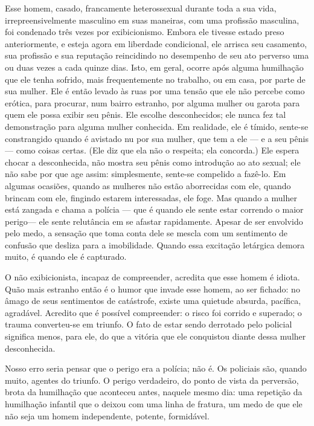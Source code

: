 Esse homem, casado, francamente heterossexual durante toda a sua
vida, irrepreensivelmente masculino em suas maneiras, com uma profissão
masculina, foi condenado três vezes por exibicionismo. Embora ele
tivesse estado preso anteriormente, e esteja agora em liberdade
condicional, ele arrisca seu casamento, sua profissão e sua reputação
reincidindo no desempenho de seu ato perverso uma ou duas vezes a cada
quinze dias. Isto, em geral, ocorre após alguma humilhação que ele
tenha sofrido, mais frequentemente no trabalho, ou em casa, por parte
de sua mulher. Ele é então levado às ruas por uma tensão que ele não
percebe como erótica, para procurar, num bairro estranho, por alguma
mulher ou garota para quem ele possa exibir seu pênis. Ele escolhe
desconhecidos; ele nunca fez tal demonstração para alguma mulher
conhecida. Em realidade, ele é tímido, sente-se constrangido quando é
avistado nu por sua mulher, que tem a ele --- e a seu pênis --- como
coisas certas. (Ele diz que ela não o respeita; ela concorda.) Ele
espera chocar a desconhecida, não mostra seu pênis como introdução ao
ato sexual; ele não sabe por que age assim: simplesmente, sente-se
compelido a fazê-lo. Em algumas ocasiões, quando as mulheres não estão
aborrecidas com ele, quando brincam com ele, fingindo estarem
interessadas, ele foge. Mas quando a mulher está zangada e chama a
polícia --- que é quando ele sente estar correndo o maior perigo\idxexibiexpo[|(] ---
ele sente relutância em se afastar rapidamente. Apesar de ser envolvido
pelo medo, a sensação que toma conta dele se mescla com um sentimento
de confusão que desliza para a imobilidade. Quando essa excitação
letárgica demora muito, é quando ele é capturado.

O não exibicionista, incapaz de compreender, acredita que esse homem
é idiota. Quão mais estranho então é o humor que invade esse homem, ao
ser fichado: no âmago de seus sentimentos de catástrofe, existe uma
quietude absurda, pacífica, agradável. Acredito que é possível
compreender: o risco foi corrido e superado; o trauma\idxtraumaexib{} converteu-se em
triunfo. O fato de estar sendo derrotado pelo policial significa menos,
para ele, do que a vitória que ele conquistou diante dessa mulher
desconhecida.

Nosso erro seria pensar que o perigo era a polícia; não é. Os
policiais são, quando muito, agentes do triunfo. O perigo verdadeiro,
do ponto de vista da perversão, brota da humilhação que aconteceu
antes, naquele mesmo dia: uma repetição da humilhação infantil que o
deixou com uma linha de fratura, um medo de que ele não seja um homem
independente, potente, formidável.

